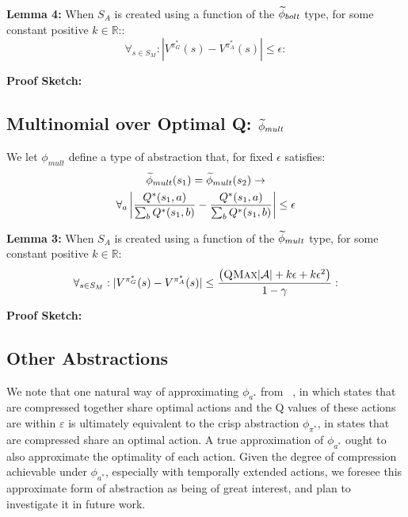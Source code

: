 {\bf Lemma 4:} When $S_A$ is created using a function of the $\widetilde \phi_{bolt}$ type, for some constant positive $k \in \mathbb{R}$::
\begin{equation}
\forall_{s \in S_M} : | V^{\pi^*_G}(s) - V^{\pi^*_{A}}(s) | \leq 
\epsilon:
\end{equation}

{\bf Proof Sketch:}





\subsection{Multinomial over Optimal Q: $\widetilde \phi_{mult}$}
\label{sec:mult}

We let $\phi_{mult}$ define a type of abstraction that, for fixed $\epsilon$ satisfies:
\begin{multline}
\widetilde \phi_{mult}(s_1) = \widetilde \phi_{mult}(s_2) \rightarrow \\
\forall_{a} \left|\frac{Q^*(s_1,a)}{\sum_b Q^*(s_1,b)} - \frac{Q^*(s_1,a)}{\sum_b Q^*(s_1,b)}\right| \leq \epsilon
\end{multline}


{\bf Lemma 3:} When $S_A$ is created using a function of the $\widetilde \phi_{mult}$ type, for some constant positive $k \in \mathbb{R}$:
\begin{equation}
\forall_{s \in S_M} : | V^{\pi^*_G}(s) - V^{\pi^*_{A}}(s) | \leq \frac{\left(\textsc{QMax}|\mathcal{A}| + k \epsilon + k \epsilon^2\right)}{1-\gamma}:
\end{equation}



{\bf Proof Sketch:}




\subsection{Other Abstractions}

We note that one natural way of approximating $\phi_{a^*}$ from ~\cite{li2006towards}, in which states that are compressed together share optimal actions and the Q values of these actions are within $\varepsilon$ is ultimately equivalent to the crisp abstraction $\phi_{\pi^*}$, in states that are compressed share an optimal action. A true approximation of $\phi_{a^*}$ ought to also approximate the optimality of each action. Given the degree of compression achievable under $\phi_{a^*}$, especially with temporally extended actions, we foresee this approximate form of abstraction as being of great interest, and plan to investigate it in future work.

